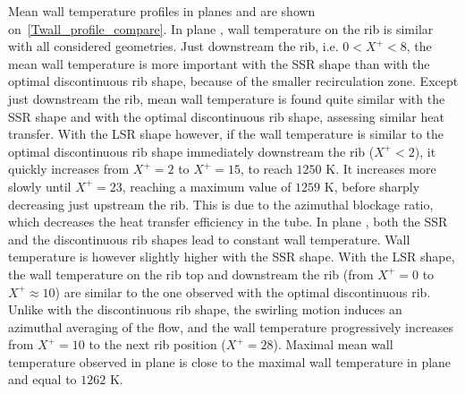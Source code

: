 Mean wall temperature profiles in planes  and  are shown on~\cref{Twall_profile_compare}. In plane , wall temperature on the rib is similar with all considered geometries. Just downstream the rib, i.e. $0<X^+<8$, the mean wall temperature is more important with the SSR shape than with the optimal discontinuous rib shape, because of the smaller recirculation zone. Except just downstream the rib, mean wall temperature is found quite similar with the SSR shape and with the optimal discontinuous rib shape, assessing similar heat transfer. With the LSR shape however, if the wall temperature is similar to the optimal discontinuous rib shape immediately downstream the rib ($X^+<2$), it quickly increases from $X^+=2$ to $X^+=15$, to reach $1250$ K. It increases more slowly until $X^+=23$, reaching a maximum value of $1259$ K, before sharply decreasing just upstream the rib. This is due to the azimuthal blockage ratio, which decreases the heat transfer efficiency in the tube. In plane , both the SSR and the discontinuous rib shapes lead to constant wall temperature. Wall temperature is however slightly higher with the SSR shape. With the LSR shape, the wall temperature on the rib top and downstream the rib (from $X^+=0$ to $X^+ \approx 10$) are similar to the one observed with the optimal discontinuous rib. Unlike with the discontinuous rib shape, the swirling motion induces an azimuthal averaging of the flow, and the wall temperature progressively increases from $X^+=10$ to the next rib position ($X^+=28$). Maximal mean wall temperature observed in plane  is close to the maximal wall temperature in plane  and equal to $1262$ K.

